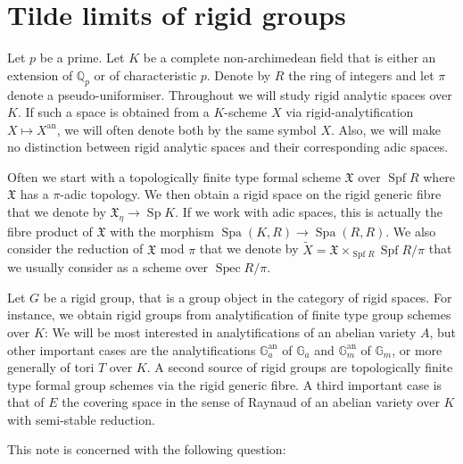 \documentclass[11pt,oneside]{amsart}
\theoremstyle{definition}
\theoremstyle{remark}
\begin{document}
	\section{Tilde limits of rigid groups}
	
	Let $p$ be a prime. Let $K$ be a complete non-archimedean field that is either an extension of $\mathbb Q_p$ or of characteristic $p$. Denote by $R$ the ring of integers and let $\pi$ denote a pseudo-uniformiser. Throughout we will study rigid analytic spaces over $K$. If such a space is obtained from a $K$-scheme $X$ via rigid-analytification $X\mapsto X^{\operatorname{an}}$, we will often denote both by the same symbol $X$. Also, we will make no distinction between rigid analytic spaces and their corresponding adic spaces.
	
	Often we start with a topologically finite type formal scheme $\mathfrak X$ over $\operatorname{Spf} R$ where $\mathfrak X$ has a $\pi$-adic topology. We then obtain a rigid space on the rigid generic fibre that we denote by $\mathfrak X_\eta \rightarrow \operatorname {Sp} K$. If we work with adic spaces, this is actually the fibre product of $\mathfrak X$ with the morphism $\operatorname{Spa}(K,R)\rightarrow \operatorname{Spa}(R,R)$. We also consider the reduction of $\mathfrak X$ mod $\pi$ that we denote by $\tilde{X}=\mathfrak X\times_{\operatorname{Spf}R}\operatorname{Spf}R/\pi$ that we usually consider as a scheme over $\operatorname{Spec}R/\pi$.

	Let $G$ be a rigid group, that is a group object in the category of rigid spaces. For instance, we obtain rigid groups from analytification of finite type group schemes over $K$: We will be most interested in analytifications of an abelian variety $A$, but other important cases are the analytifications  $\mathbb G_a^{\operatorname{an}}$ of $\mathbb G_a$ and $\mathbb G_m^{\operatorname{an}}$ of $\mathbb G_m$, or more generally of tori $T$ over $K$. A second source of rigid groups are topologically finite type formal group schemes via the rigid generic fibre. A third important case is that of $E$ the covering space in the sense of Raynaud of an abelian variety over $K$ with semi-stable reduction.
	
	This note is concerned with the following question:
	
\end{document}
